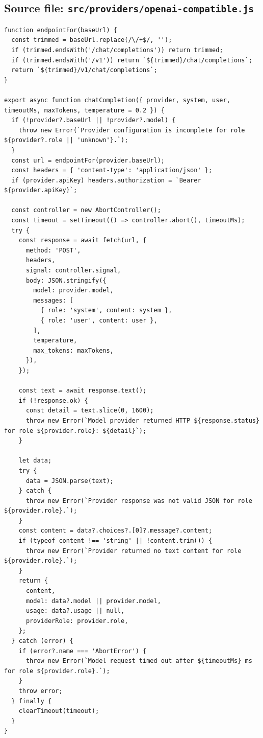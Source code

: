 \documentclass[10pt,a4paper]{article}
\begin{document}
\subsection{Source file: \texttt{src/providers/openai-compatible.js}}
\begin{lstlisting}
function endpointFor(baseUrl) {
  const trimmed = baseUrl.replace(/\/+$/, '');
  if (trimmed.endsWith('/chat/completions')) return trimmed;
  if (trimmed.endsWith('/v1')) return `${trimmed}/chat/completions`;
  return `${trimmed}/v1/chat/completions`;
}

export async function chatCompletion({ provider, system, user, timeoutMs, maxTokens, temperature = 0.2 }) {
  if (!provider?.baseUrl || !provider?.model) {
    throw new Error(`Provider configuration is incomplete for role ${provider?.role || 'unknown'}.`);
  }
  const url = endpointFor(provider.baseUrl);
  const headers = { 'content-type': 'application/json' };
  if (provider.apiKey) headers.authorization = `Bearer ${provider.apiKey}`;

  const controller = new AbortController();
  const timeout = setTimeout(() => controller.abort(), timeoutMs);
  try {
    const response = await fetch(url, {
      method: 'POST',
      headers,
      signal: controller.signal,
      body: JSON.stringify({
        model: provider.model,
        messages: [
          { role: 'system', content: system },
          { role: 'user', content: user },
        ],
        temperature,
        max_tokens: maxTokens,
      }),
    });

    const text = await response.text();
    if (!response.ok) {
      const detail = text.slice(0, 1600);
      throw new Error(`Model provider returned HTTP ${response.status} for role ${provider.role}: ${detail}`);
    }

    let data;
    try {
      data = JSON.parse(text);
    } catch {
      throw new Error(`Provider response was not valid JSON for role ${provider.role}.`);
    }
    const content = data?.choices?.[0]?.message?.content;
    if (typeof content !== 'string' || !content.trim()) {
      throw new Error(`Provider returned no text content for role ${provider.role}.`);
    }
    return {
      content,
      model: data?.model || provider.model,
      usage: data?.usage || null,
      providerRole: provider.role,
    };
  } catch (error) {
    if (error?.name === 'AbortError') {
      throw new Error(`Model request timed out after ${timeoutMs} ms for role ${provider.role}.`);
    }
    throw error;
  } finally {
    clearTimeout(timeout);
  }
}
\end{lstlisting}
\end{document}
